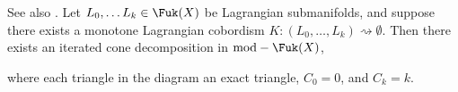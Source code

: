 
See also \cite{tanaka2016fukaya}.
Let $L_0, \ldots L_k\in \Fuk(X)$ be Lagrangian submanifolds, and suppose there exists a monotone Lagrangian cobordism $K: (L_0, \ldots, L_k)\rightsquigarrow \emptyset$. Then there exists an iterated cone decomposition in $\text{mod}-\Fuk(X)$,

where each triangle in the diagram an exact triangle, $C_0=0$, and $C_k=k$.

